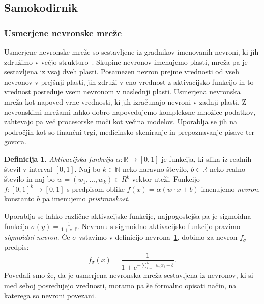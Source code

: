 \documentclass[12pt,a4paper,twoside]{article}
\theoremstyle{definition} %
\newtheorem{definicija}{Definicija}[section]
\theoremstyle{plain} %
\numberwithin{equation}{section}  %
\newcommand{\R}{\mathbb R}
\begin{document}

\subsection{Samokodirnik}



\subsubsection{Usmerjene nevronske mreže}

Usmerjene nevronske mreže so sestavljene iz gradnikov imenovanih nevroni, ki jih združimo v večjo strukturo~\cite{nielsen2015neural}.
Skupine nevronov imenujemo plasti, mreža pa je sestavljena iz vsaj dveh plasti.
Posamezen nevron prejme vrednosti od vseh nevronov v prejšnji plasti, jih združi v eno vrednost z aktivacijsko funkcijo in to vrednost posreduje vsem nevronom v naslednji plasti.
Usmerjena nevronska mreža kot napoved vrne vrednosti, ki jih izračunajo nevroni v zadnji plasti.
Z nevronskimi mrežami lahko dobro napovedujemo kompleksne množice podatkov, zahtevajo pa več procesorske moči kot večina modelov. 
Uporablja se jih na področjih kot so finančni trgi, medicinsko skeniranje in prepoznavanje pisave ter govora. 

\begin{definicija}
\label{nevron}
	\emph{Aktivacijska funkcija} $\alpha: \R \rightarrow [0,1]$ je funkcija, ki slika iz realnih števil v interval $[0,1]$.
	Naj bo $k \in \mathbb{N}$ neko naravno število, $b \in \R$ neko realno število in naj bo $w=(w_1,\ldots,w_k) \in R^k$ vektor uteži.
	Funkcijo $f: [0,1]^k \rightarrow [0,1]$ s predpisom oblike $f(x) = \alpha(w\cdot x + b)$ imenujemo \emph{nevron}, konstanto $b$ pa imenujemo \emph{pristranskost}.
\end{definicija}

Uporablja se lahko različne aktivacijske funkcije, najpogostejša pa je sigmoidna funkcija $\sigma(y) = \frac{1}{1+e^{-y}}$. 
Nevronu s sigmoidno aktivacijsko funkcijo pravimo \emph{sigmoidni nevron}. Če $\sigma$ vstavimo v definicijo nevrona~\ref{nevron}, dobimo za nevron $f_{\sigma}$ predpis:
\[
f_{\sigma}(x)= \frac{1}{1+e^{-\sum_{i=1}^k w_i x_i - b}}.
\]
Povedali smo že, da je usmerjena nevronska mreža sestavljena iz nevronov, ki si med seboj posredujejo vrednosti, moramo pa še formalno opisati način, na katerega so nevroni povezani.
\end{document}
